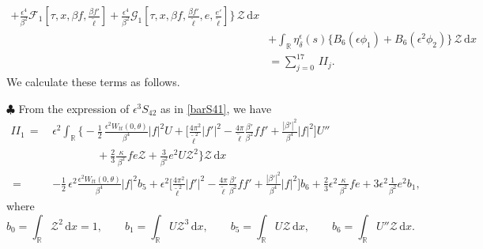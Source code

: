 \documentclass[10pt, reqno]{amsart}
\numberwithin{equation}{section}
\theoremstyle{definition}
\begin{document}
{\begin{align}
 + \frac{\epsilon^4}{\beta^2} \mathcal F_1\left[\tau, x, \beta f, \frac{\beta f'}{\tilde\ell}\right]
 +\frac{\epsilon^4} {\beta^2} \mathcal G_1\left[\tau, x, \beta f, \frac{\beta f'}{\tilde\ell}, e, \frac{e'}{\tilde\ell}\right] \Bigg\} \,{\mathcal Z} \,{\mathrm d}x
  \nonumber\\[2mm]
&
 +\int_{\mathbb R} \eta_\delta^\epsilon(s) \Bigg\{ B_{6}(\epsilon\phi_1)
 + B_6 (\epsilon^2{\phi_2}) \Bigg\} \,{\mathcal Z} \,{\mathrm d}x
 \nonumber\\[2mm]
& = \sum_{j=0}^{17}\,II_j.
\end{align}
We calculate these terms as follows.






\smallskip\noindent$\clubsuit$
 From the expression of $\epsilon^3 S_{42}$ as in \eqref{barS41}, we have
\begin{align}\label{ESTIMATEII1}
II_1
\,=\,&\epsilon^2 \int_{{\mathbb R}} \Bigg\{
-\frac{1}{2}\, \frac{ \epsilon^2W_{tt}(0, \theta)}{\beta^4}|f|^2 U
+
\Big[\frac{4\pi^2}{{\tilde\ell}^2}|f'|^2
-\frac{4\pi}{{\tilde\ell}}\frac{\beta'}{\beta^2}ff'
+\frac{|\beta'|^2}{\beta^4} |f|^2
\Big]U''
\nonumber\\[2mm]
 & \qquad\qquad
+\frac 23 \frac{\kappa}{\, \beta^2\, } fe{\mathcal Z}
+\frac3{\beta^2}e^2U{\mathcal Z}^2
\Bigg\}\mathcal Z \,{\mathrm d}x
\nonumber\\[2mm]
\,=\,& -\frac{1}{2}\, \epsilon^2 \frac{ \epsilon^2W_{tt}(0, \theta)}{\beta^4}|f|^2 b_5 + \epsilon^2\Big[\frac{4\pi^2}{{\tilde\ell}^2}|f'|^2
-\frac{4\pi}{{\tilde\ell}}\frac{\beta'}{\beta^2}ff'
+\frac{|\beta'|^2}{\beta^4} |f|^2
\Big] b_6
+\frac 23\epsilon^2 \frac{\kappa}{\, \beta^2\, } fe + 3\epsilon^2\frac{1}{\beta^2}e^2b_1 ,
\end{align}
where
\[
b_0 = \int_{{\mathbb R}}{\mathcal Z}^2 \,{\mathrm d}x=1,
\qquad
b_1= \int_{{\mathbb R}}U{\mathcal Z}^3 \,{\mathrm d}x,
\qquad
b_5 = \int_{{\mathbb R}} U\mathcal Z \,{\mathrm d}x,
\qquad
b_6 = \int_{{\mathbb R}} U''{\mathcal Z} \,{\mathrm d}x.
\]



}
\end{document}
